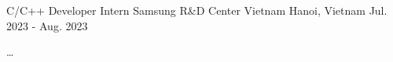 

\begin{cventries}

  \cventry
    {C/C++ Developer Intern} %
    {Samsung R\&D Center Vietnam} %
    {Hanoi, Vietnam} %
    {Jul. 2023 - Aug. 2023} %
    {
      \begin{cvitems} %
        \item {\dots}
      \end{cvitems}
    }

\end{cventries}
